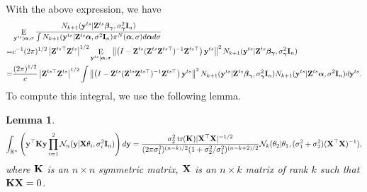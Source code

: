 \documentclass[11pt]{article}
\DeclareMathOperator{\mytr}{tr}
\DeclareMathOperator{\myE}{E}
\newcommand{\By}{\mathbf{y}}    \newcommand{\Bz}{\mathbf{z}}
\newcommand{\bfsym}[1]{\ensuremath{\boldsymbol{#1}}}
\def\balpha{\bfsym \alpha}
\def\bbeta{\bfsym \beta}
\def\bgamma{\bfsym \gamma}             \def\bGamma{\bfsym \Gamma}
\theoremstyle{plain}
\newtheorem{lemma}{\quad\quad Lemma}
\theoremstyle{definition}
\theoremstyle{remark}
\begin{document}
With the above expression, we have
\begin{equation*}
    \begin{split}
    &\myE_{\By^{ts}|\balpha, \sigma}
    \frac{N_{k+1} (\By^{ts} | \BZ^{ts} \bbeta_{\bgamma}, \sigma^2_{\bgamma} \BI_n)}{\int N_{k+1} (\By^{ts} | \BZ^{ts} \balpha, \sigma^2 \BI_n) \pi^N (\balpha, \sigma) d\balpha d \sigma}
    \\
    =
    &
    c^{-1}
    (2\pi)^{1/2} \left| \BZ^{ts\top} \BZ^{ts} \right|^{1/2} 
    \myE_{\By^{ts}|\balpha, \sigma}
     \left\|\left(I-\BZ^{ts} (\BZ^{ts} \BZ^{ts\top})^{-1}\BZ^{ts\top}\right)\By^{ts}\right\|^2
    N_{k+1} (\By^{ts} | \BZ^{ts} \bbeta_{\bgamma}, \sigma^2_{\bgamma} \BI_n)
    \\
    =
    &
    \frac{(2\pi)^{1/2}}{c} \left| \BZ^{ts\top} \BZ^{ts} \right|^{1/2} 
    \int
     \left\|\left(I-\BZ^{ts} (\BZ^{ts} \BZ^{ts\top})^{-1}\BZ^{ts\top}\right)\By^{ts}\right\|^2
    N_{k+1} (\By^{ts} | \BZ^{ts} \bbeta_{\bgamma}, \sigma^2_{\bgamma} \BI_n)
    N_{k+1} (\By^{ts} | \BZ^{ts} \balpha, \sigma^2 \BI_n)
    d\By^{ts}.
    \end{split}
\end{equation*}
To compute this integral, we use the following lemma.
\begin{lemma}
    \begin{equation*}
    \int_{\mathbb R^n} \left(\By^\top \BK \By \prod_{i=1}^2 \mathcal N_n (\By| \BX \theta_i ,\sigma^2_i \BI_n)\right) d\By
    =
    \frac{\sigma_2^2 \mytr(\BK) |\BX^\top \BX|^{-1/2}}{
        (2\pi\sigma_1^2)^{(n-k)/2} (1+\sigma_2^2/\sigma_1^2)^{(n-k+2)/2}
    }
    \mathcal{N}_k (\theta_2 | \theta_1,(\sigma_1^2 +\sigma_2^2) (\BX^\top \BX)^{-1}),
\end{equation*}
where $\mathbf{K}$ is an $n\times n$ symmetric matrix, $\mathbf{X}$ is an $n\times k $ matrix of rank $k$ such that $\mathbf{K} \mathbf{X}=0$.
\end{lemma}
\end{document}
